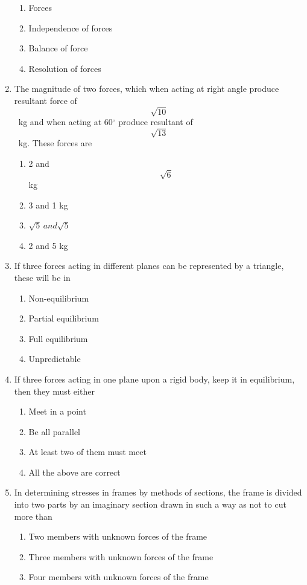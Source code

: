 \documentclass[11pt,a4paper]{article}
\begin{document}
\begin{enumerate}
\begin{enumerate}[label=\Alph*.]
\item{Forces}
\item{Independence of forces}
\item{Balance of force}
\item{Resolution of forces}
\end{enumerate}
\item{The magnitude of two forces, which when acting at right angle produce resultant force of $$\sqrt {10} $$ ~kg and when acting at 60$^\circ$ produce resultant of $$\sqrt {13} $$ ~kg. These forces are
}
\begin{enumerate}[label=\Alph*.]
\item{2 and $$\sqrt 6 $$ kg}
\item{3 and 1 kg}
\item{$ \sqrt 5\,$$ and $$\sqrt 5 $$  $}
\item{2 and 5 kg}
\end{enumerate}
\item{If three forces acting in different planes can be represented by a triangle, these will be in}
\begin{enumerate}[label=\Alph*.]
\item{Non-equilibrium}
\item{Partial equilibrium}
\item{Full equilibrium}
\item{Unpredictable}
\end{enumerate}
\item{If three forces acting in one plane upon a rigid body, keep it in equilibrium, then they must either}
\begin{enumerate}[label=\Alph*.]
\item{Meet in a point}
\item{Be all parallel}
\item{At least two of them must meet}
\item{All the above are correct}
\end{enumerate}
\item{In determining stresses in frames by methods of sections, the frame is divided into two parts by an imaginary section drawn in such a way as not to cut more than}
\begin{enumerate}[label=\Alph*.]
\item{Two members with unknown forces of the frame}
\item{Three members with unknown forces of the frame}
\item{Four members with unknown forces of the frame}

\end{enumerate}
\end{enumerate}
\end{document}
